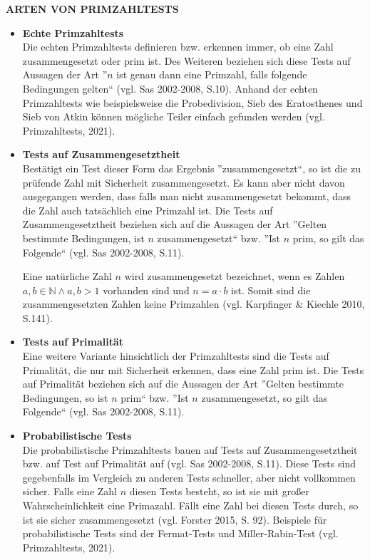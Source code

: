 \textbf{ARTEN VON PRIMZAHLTESTS}
\begin{itemize}
 \item \textbf{Echte Primzahltests}\\
    Die echten Primzahltests definieren bzw. erkennen immer,
    ob eine Zahl zusammengesetzt oder prim ist. Des Weiteren
    beziehen sich diese Tests auf Aussagen der Art ''$n$ ist
    genau dann eine Primzahl, falls folgende Bedingungen
    gelten`` (vgl. Sas 2002-2008, S.10). Anhand der echten
    Primzahltests wie beispielsweise die Probedivision,
    Sieb des Eratosthenes und Sieb von Atkin können mögliche
    Teiler einfach gefunden werden (vgl. Primzahltests, 2021).
    
 \item \textbf{Tests auf Zusammengesetztheit}\\
    Bestätigt ein Test dieser Form das Ergebnis
    ''zusammengesetzt``, so ist die zu prüfende Zahl mit
    Sicherheit zusammengesetzt. Es kann aber nicht davon
    ausgegangen werden, dass falls man nicht zusammengesetzt
    bekommt, dass die Zahl auch tatsächlich eine Primzahl ist.
    Die Tests auf Zusammengesetztheit beziehen sich auf die
    Aussagen der Art ''Gelten bestimmte Bedingungen, ist $n$
    zusammengesetzt`` bzw. ''Ist $n$ prim, so gilt das
    Folgende`` (vgl. Sas 2002-2008, S.11).
    
    Eine natürliche Zahl $n$ wird zusammengesetzt bezeichnet,
    wenn es Zahlen $a,b \in\mathbb{N} \land a,b > 1$ vorhanden
    sind und $n = a\cdot b$ ist. Somit sind die
    zusammengesetzten Zahlen keine Primzahlen
    (vgl. Karpfinger \& Kiechle 2010, S.141).
    
 \item \textbf{Tests auf Primalität}\\
    Eine weitere Variante hinsichtlich der Primzahltests
    sind die Tests auf Primalität, die nur mit Sicherheit
    erkennen, dass eine Zahl prim ist. Die Tests auf Primalität
    beziehen sich auf die Aussagen der Art ''Gelten bestimmte
    Bedingungen, so ist $n$ prim`` bzw. ''Ist $n$
    zusammengesetzt, so gilt das Folgende``
    (vgl. Sas 2002-2008, S.11).
    
 \item \textbf{Probabilistische Tests}\\
    Die probabilistische Primzahltests bauen auf Tests auf
    Zusammengesetztheit bzw. auf Test auf Primalität auf
    (vgl. Sas 2002-2008, S.11). Diese Tests sind gegebenfalls
    im Vergleich zu anderen Tests schneller, aber nicht
    vollkommen sicher. Falls eine Zahl $n$ diesen Tests besteht,
    so ist sie mit großer Wahrscheinlichkeit eine Primazahl.
    Fällt eine Zahl bei diesen Tests durch, so ist sie sicher
    zusammengesetzt (vgl. Forster 2015, S. 92). Beispiele für
    probabilistische Tests sind der Fermat-Tests und
    Miller-Rabin-Test (vgl. Primzahltests, 2021).
    

\end{itemize}

